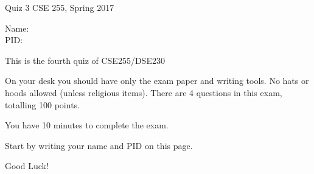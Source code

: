 \documentclass[10pt]{article}
\begin{document}
\setlength\parindent{0pt}
\thispagestyle{empty}

{\textbf \Large Quiz 3} \hfill CSE 255, Spring 2017
\\

\vspace{.1in}

Name: \underline{\hspace{3in}}
\\

PID: \underline{\hspace{3.15in}}

\vspace{.1in}

{\small \setlength\parindent{20pt}This is the fourth quiz of CSE255/DSE230

On your desk you should have only the exam paper and writing tools.
No hats or hoods allowed (unless religious items).
There are 4 questions in this exam, totalling 100 points.

You have 10 minutes to complete the exam.

Start by writing your name and PID on this page.

Good Luck!}\\
\underline{\hspace{6in}}
\end{document}

